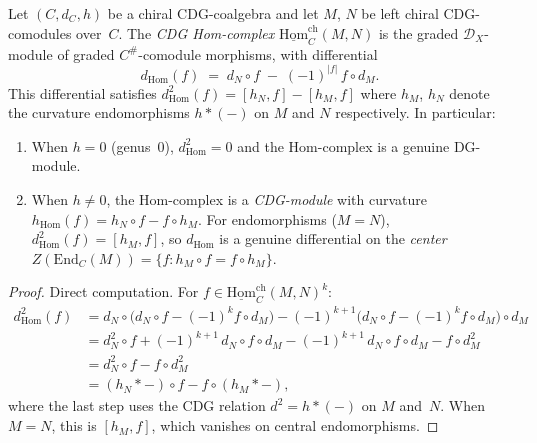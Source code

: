 \begin{proposition}
\label{prop:cdg-hom-complex}
Let $(C, d_C, h)$ be a chiral CDG-coalgebra and let $M$, $N$ be
left chiral CDG-comodules over~$C$. The \emph{CDG Hom-complex}
$\underline{\mathrm{Hom}}_C^{\mathrm{ch}}(M, N)$ is the graded
$\mathcal{D}_X$-module of graded $C^{\#}$-comodule morphisms,
with differential
\begin{equation}\label{eq:cdg-hom-differential}
d_{\mathrm{Hom}}(f) \;=\; d_N \circ f
\;-\; (-1)^{|f|}\, f \circ d_M.
\end{equation}
This differential satisfies $d_{\mathrm{Hom}}^2(f) = [h_N, f] - [h_M, f]$
where $h_M$, $h_N$ denote the curvature endomorphisms
$h \ast (-)$ on $M$ and $N$ respectively. In particular:
\begin{enumerate}[label=\textup{(\alph*)}]
\item When $h = 0$ \textup{(}genus~$0$\textup{)},
 $d_{\mathrm{Hom}}^2 = 0$ and the Hom-complex is a genuine
 DG-module.
\item When $h \neq 0$, the Hom-complex is a \emph{CDG-module}
 with curvature $h_{\mathrm{Hom}}(f) = h_N \circ f - f \circ h_M$.
 For endomorphisms ($M = N$),
 $d_{\mathrm{Hom}}^2(f) = [h_M, f]$, so $d_{\mathrm{Hom}}$ is
 a genuine differential on the \emph{center}
 $Z(\mathrm{End}_C(M)) = \{f : h_M \circ f = f \circ h_M\}$.
\end{enumerate}
\end{proposition}

\begin{proof}
Direct computation. For $f \in \underline{\mathrm{Hom}}_C^{\mathrm{ch}}(M, N)^k$:
\begin{align*}
d_{\mathrm{Hom}}^2(f)
&= d_N \circ \bigl(d_N \circ f - (-1)^k f \circ d_M\bigr)
 - (-1)^{k+1}\bigl(d_N \circ f - (-1)^k f \circ d_M\bigr) \circ d_M \\
&= d_N^2 \circ f + (-1)^{k+1}\, d_N \circ f \circ d_M
 - (-1)^{k+1}\, d_N \circ f \circ d_M - f \circ d_M^2 \\
&= d_N^2 \circ f - f \circ d_M^2 \\
&= (h_N \ast -) \circ f - f \circ (h_M \ast -),
\end{align*}
where the last step uses the CDG relation $d^2 = h \ast (-)$ on
$M$ and~$N$. When $M = N$, this is $[h_M, f]$, which vanishes
on central endomorphisms.
\end{proof}


